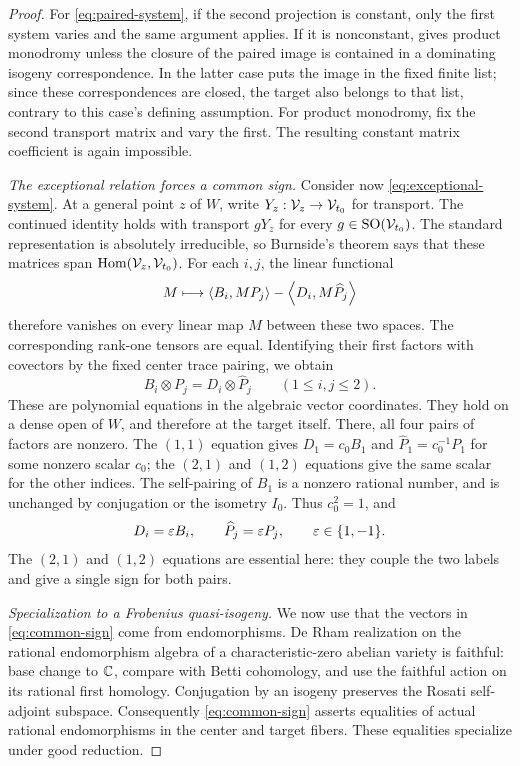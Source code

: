 \begin{proof}
For \eqref{eq:paired-system}, if the second projection is constant, only
the first system varies and the same argument applies.  If it is
nonconstant,  gives product monodromy unless the
closure of the paired image is contained in a dominating isogeny
correspondence.  In the latter case
 puts the image in the fixed finite list;
since these correspondences are closed, the target also belongs to that
list, contrary to this case's defining assumption.  For product
monodromy, fix the second transport matrix and vary the first.  The
resulting constant matrix coefficient is again impossible.

\emph{The exceptional relation forces a common sign.}
Consider now \eqref{eq:exceptional-system}.  At a general point $z$ of
$W$, write $Y_z:\mathcal V_z\to\mathcal V_{t_0}$ for transport.  The continued
identity holds with transport $gY_z$ for every
$g\in\operatorname{SO}(\mathcal V_{t_0})$.  The standard representation is absolutely
irreducible, so Burnside's theorem says that these matrices span
$\operatorname{Hom}(\mathcal V_z,\mathcal V_{t_0})$.  For each $i,j$, the linear functional
\[
 M\longmapsto\left\langle B_i,MP_j\right\rangle-\left\langle D_i,M\widehat P_j\right\rangle
\]
therefore vanishes on every linear map $M$ between these two spaces.
The corresponding rank-one tensors are equal.  Identifying their first
factors with covectors by the fixed center trace pairing, we obtain
\begin{equation}\label{eq:burnside-tensors}
 B_i\otimes P_j=D_i\otimes\widehat P_j
 \qquad(1\le i,j\le2).
\end{equation}
These are polynomial equations in the algebraic vector coordinates.
They hold on a dense open of $W$, and therefore at the target itself.
There, all four pairs of factors are nonzero.  The $(1,1)$ equation
gives $D_1=c_0B_1$ and $\widehat P_1=c_0^{-1}P_1$ for some nonzero
scalar $c_0$; the $(2,1)$ and $(1,2)$ equations give the same scalar for
the other indices.  The self-pairing of $B_1$ is a nonzero rational
number, and is unchanged by conjugation or the isometry $I_0$.  Thus
$c_0^2=1$, and
\begin{equation}\label{eq:common-sign}
 D_i=\varepsilon B_i,\qquad \widehat P_j=\varepsilon P_j,
 \qquad \varepsilon\in\{1,-1\}.
\end{equation}
The $(2,1)$ and $(1,2)$ equations are essential here: they couple the
two labels and give a single sign for both pairs.

\emph{Specialization to a Frobenius quasi-isogeny.}
We now use that the vectors in \eqref{eq:common-sign} come from
endomorphisms.  De Rham realization on the rational endomorphism algebra
of a characteristic-zero abelian variety is faithful: base change to
$\mathbb C$, compare with Betti cohomology, and use the faithful action on its
rational first homology.  Conjugation by an isogeny preserves the Rosati
self-adjoint subspace.  Consequently \eqref{eq:common-sign} asserts
equalities of actual rational endomorphisms in the center and target
fibers.  These equalities specialize under good reduction.


\end{proof}
